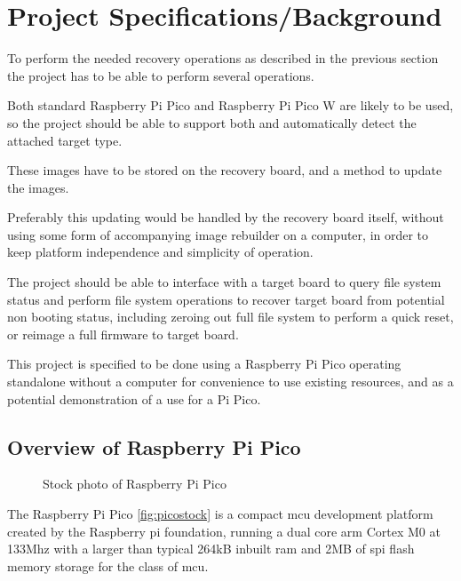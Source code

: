 \clearpage%
\vspace{21.5pt}
\chapter{Project Specifications/Background}

To perform the needed recovery operations as described in the previous section the project has to be able to perform several operations.

Both standard Raspberry Pi Pico and Raspberry Pi Pico W are likely to be used, so the project should be able to support both and automatically detect the attached target type.

These images have to be stored  on the recovery board, and a method to update the images.

Preferably this updating would be handled by the recovery board itself, without using some form of accompanying image rebuilder on a computer, in order to keep platform independence and simplicity of operation.

The project should be able to interface with a target board to query file system status and perform file system operations to recover target board from potential non booting status, including zeroing out full file system to perform a quick reset, or reimage a full firmware to target board.

This project is specified to be done using a Raspberry Pi Pico operating standalone without a computer for convenience to use existing resources, and as a potential demonstration of a use for a Pi Pico.

\clearpage
\section{Overview of Raspberry Pi Pico}

\begin{figure}[ht]
	\centering
	\caption{Stock photo of Raspberry Pi Pico}
	\label{fig:picostock}
\end{figure}

The Raspberry Pi Pico \autoref{fig:picostock} is a compact \gls{mcu} development platform created by the Raspberry pi foundation, running a dual core \gls{arm} Cortex M0 at 133Mhz with a larger than typical 264kB inbuilt \gls{ram} and 2MB of \gls{spi} flash memory storage for the class of \gls{mcu}\cite{ltdBuyRaspberryPi}.

